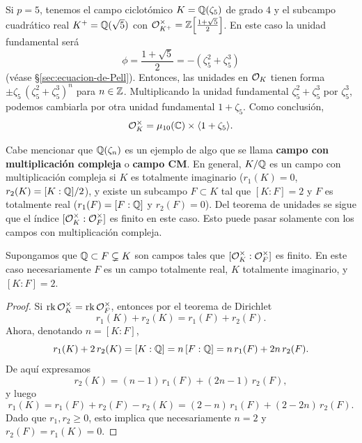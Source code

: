 \begin{ejemplo}
  Si $p = 5$, tenemos el campo ciclotómico $K = \mathbb{Q} (\zeta_5)$ de grado $4$ y el
  subcampo cuadrático real $K^+ = \mathbb{Q} (\sqrt{5})$ con
  $\mathcal{O}_{K^+}^\times = \mathbb{Z} \Bigl[\frac{1+\sqrt{5}}{2}\Bigr]$. En este caso la
  unidad fundamental será
  $$\phi = \frac{1+\sqrt{5}}{2} = -(\zeta_5^2 + \zeta_5^3)$$
  (véase \S\ref{sec:ecuacion-de-Pell}). Entonces, las unidades en $\mathcal{O}_K$ tienen
  forma $\pm \zeta_5\,(\zeta_5^2 + \zeta_5^3)^n$ para $n \in \mathbb{Z}$.
  Multiplicando la unidad fundamental $\zeta_5^2 + \zeta_5^3$ por $\zeta_5^3$,
  podemos cambiarla por otra unidad fundamental $1 + \zeta_5$. Como conclusión,
  \[ \mathcal{O}_K^\times = \mu_{10} (\mathbb{C}) \times \langle 1 + \zeta_5\rangle. \qedhere \]
\end{ejemplo}

Cabe mencionar que $\mathbb{Q} (\zeta_n)$ es un ejemplo de algo que se llama
\textbf{campo con multiplicación compleja} o \textbf{campo CM}. En general,
$K/\mathbb{Q}$ es un campo con multiplicación compleja si $K$ es totalmente imaginario
($r_1 (K) = 0$, $r_2 (K) = [K : \mathbb{Q}]/2$), y existe un subcampo $F \subset K$ tal
que $[K : F] = 2$ y $F$ es totalmente real
($r_1 (F) = [F : \mathbb{Q}]$ y $r_2 (F) = 0$). Del teorema de unidades se sigue que
el índice $[\mathcal{O}_K^\times : \mathcal{O}_F^\times]$ es finito en este caso. Esto puede pasar
solamente con los campos con multiplicación compleja.

\begin{proposicion}[Einheitsdefekt]
  Supongamos que $\mathbb{Q} \subset F \subsetneq K$ son campos tales que
  $[\mathcal{O}_K^\times : \mathcal{O}_F^\times]$ es finito. En este caso necesariamente $F$ es un
  campo totalmente real, $K$ totalmente imaginario, y $[K : F] = 2$.

  \begin{proof}
    Si $\operatorname{rk} \mathcal{O}_K^\times = \operatorname{rk} \mathcal{O}_F^\times$, entonces por el teorema de Dirichlet
    $$r_1 (K) + r_2 (K) = r_1 (F) + r_2 (F).$$
    Ahora, denotando $n = [K : F]$,
    \[ r_1 (K) + 2\,r_2 (K) = [K : \mathbb{Q}] = n\,[F : \mathbb{Q}] =
       n\,r_1 (F) + 2n\,r_2 (F). \]
    De aquí expresamos
    $$r_2 (K) = (n-1)\,r_1 (F) + (2n - 1)\,r_2 (F),$$
    y luego
    \[ r_1 (K) = r_1 (F) + r_2 (F) - r_2 (K) =
       (2-n)\,r_1 (F) + (2 - 2n)\,r_2 (F). \]
    Dado que $r_1, r_2 \ge 0$, esto implica que necesariamente $n = 2$
    y $r_2 (F) = r_1 (K) = 0$.
  \end{proof}
\end{proposicion}


